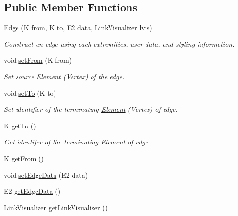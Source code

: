 \subsection*{Public Member Functions}
\begin{DoxyCompactItemize}
\item 
\mbox{\hyperlink{classbridges_1_1base_1_1_edge_a2a17f458612fbcee8e9efb8d91a6cc18}{Edge}} (K from, K to, E2 data, \mbox{\hyperlink{classbridges_1_1base_1_1_link_visualizer}{Link\+Visualizer}} lvis)
\begin{DoxyCompactList}\small\item\em Construct an edge using each extremities, user data, and styling information. \end{DoxyCompactList}\item 
void \mbox{\hyperlink{classbridges_1_1base_1_1_edge_aef1a55d996fc36217629b884435b9f35}{set\+From}} (K from)
\begin{DoxyCompactList}\small\item\em Set source \mbox{\hyperlink{classbridges_1_1base_1_1_element}{Element}} (Vertex) of the edge. \end{DoxyCompactList}\item 
void \mbox{\hyperlink{classbridges_1_1base_1_1_edge_a5e574139711be3f96c42da02a2702aea}{set\+To}} (K to)
\begin{DoxyCompactList}\small\item\em Set identifier of the terminating \mbox{\hyperlink{classbridges_1_1base_1_1_element}{Element}} (Vertex) of edge. \end{DoxyCompactList}\item 
K \mbox{\hyperlink{classbridges_1_1base_1_1_edge_ab451c13aa8173b5ef1cc2b2dd4f8508f}{get\+To}} ()
\begin{DoxyCompactList}\small\item\em Get identifer of the terminating \mbox{\hyperlink{classbridges_1_1base_1_1_element}{Element}} of edge. \end{DoxyCompactList}\item 
K \mbox{\hyperlink{classbridges_1_1base_1_1_edge_afc23a7c2ee8ab4c4f0950c9bf25edd56}{get\+From}} ()
\item 
void \mbox{\hyperlink{classbridges_1_1base_1_1_edge_a733d7f5eb4950d1fc4e14b7096faeb5c}{set\+Edge\+Data}} (E2 data)
\item 
E2 \mbox{\hyperlink{classbridges_1_1base_1_1_edge_a19a623d647eb17b7e53f1360577b0703}{get\+Edge\+Data}} ()
\item 
\mbox{\hyperlink{classbridges_1_1base_1_1_link_visualizer}{Link\+Visualizer}} \mbox{\hyperlink{classbridges_1_1base_1_1_edge_a11c655622b8a54f2931f59b1d256f84a}{get\+Link\+Visualizer}} ()

\end{DoxyCompactItemize}

